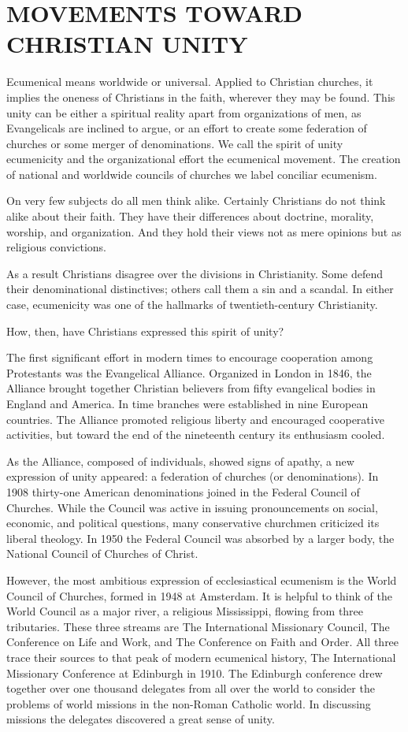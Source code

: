 \section{MOVEMENTS TOWARD CHRISTIAN UNITY}

Ecumenical means worldwide or universal. Applied to Christian churches, it implies the oneness of
Christians in the faith, wherever they may be found. This unity can be either a spiritual reality
apart from organizations of men, as Evangelicals are inclined to argue, or an effort to create some
federation of churches or some merger of denominations. We call the spirit of unity ecumenicity and
the organizational effort the ecumenical movement. The creation of national and worldwide councils
of churches we label conciliar ecumenism.

On very few subjects do all men think alike. Certainly Christians do not think alike about their
faith. They have their differences about doctrine, morality, worship, and organization. And they
hold their views not as mere opinions but as religious convictions.

As a result Christians disagree over the divisions in Christianity. Some defend their denominational
distinctives; others call them a sin and a scandal. In either case, ecumenicity was one of the
hallmarks of twentieth-century Christianity.

How, then, have Christians expressed this spirit of unity?

The first significant effort in modern times to encourage cooperation among Protestants was the
Evangelical Alliance. Organized in London in 1846, the Alliance brought together Christian believers
from fifty evangelical bodies in England and America. In time branches were established in nine
European countries. The Alliance promoted religious liberty and encouraged cooperative activities,
but toward the end of the nineteenth century its enthusiasm cooled.

As the Alliance, composed of individuals, showed signs of apathy, a new expression of unity
appeared: a federation of churches (or denominations). In 1908 thirty-one American denominations
joined in the Federal Council of Churches. While the Council was active in issuing pronouncements on
social, economic, and political questions, many conservative churchmen criticized its liberal
theology. In 1950 the Federal Council was absorbed by a larger body, the National Council of
Churches of Christ.

However, the most ambitious expression of ecclesiastical ecumenism is the World Council of Churches,
formed in 1948 at Amsterdam. It is helpful to think of the World Council as a major river, a
religious Mississippi, flowing from three tributaries. These three streams are The International
Missionary Council, The Conference on Life and Work, and The Conference on Faith and Order. All
three trace their sources to that peak of modern ecumenical history, The International Missionary
Conference at Edinburgh in 1910. The Edinburgh conference drew together over one thousand delegates
from all over the world to consider the problems of world missions in the non-Roman Catholic world.
In discussing missions the delegates discovered a great sense of unity.

